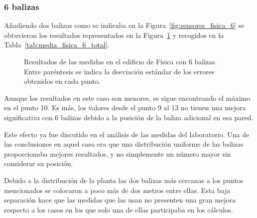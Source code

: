 \newpage
\subsubsection{6 balizas}

Añadiendo dos balizas como se indicaba en la Figura~\ref{fig:sensores_fisica_6} se obtuvieron los resultados representados en la Figura~\ref{fig:res_fisica_6} y recogidos en la Tabla~\ref{tab:media_fisica_6_total}.
\begin{figure}[H]
  \centering
  
  \caption{Resultados de las medidas en el edificio de Física con 6 balizas. \newline Entre paréntesis se indica la desviación estándar de los errores obtenidos en cada punto.}
  \label{fig:res_fisica_6}
\end{figure}

Aunque los resultados en este caso son menores, se sigue encontrando el máximo en el punto 10.
Es más, los valores desde el punto 9 al 13 no tienen una mejora significativa con 6 balizas debido a la posición de la baliza adicional en esa pared.

Este efecto ya fue discutido en el análisis de las medidas del laboratorio.
Una de las conclusiones en aquel caso era que una distribución uniforme de las balizas proporcionaba mejores resultados, y no simplemente un número mayor sin considerar su posición.

Debido a la distribución de la planta las dos balizas más cercanas a los puntos mencionados se colocaron a poco más de dos metros entre ellas.
Esta baja separación hace que las medidas que las usan no presenten una gran mejora respecto a los casos en los que solo una de ellas participaba en los cálculos.

